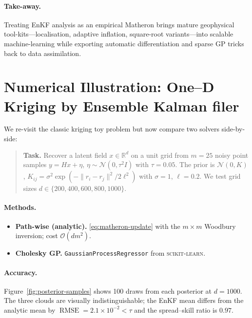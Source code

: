 \documentclass[runningheads]{llncs}
\begin{document}
\paragraph{Take-away.}
Treating EnKF analysis as an empirical Matheron  brings mature geophysical tool-kits—localisation, adaptive inflation, square-root variants—into scalable machine-learning while exporting automatic differentiation and sparse GP tricks back to data assimilation.

\section{Numerical Illustration:  One–D Kriging by Ensemble Kalman filer}
\label{sec:numerical-demo}

We re-visit the classic kriging toy problem but now compare two solvers side-by-side:

\begin{quote}
\textbf{Task.}  Recover a latent field
$x\!\in\!\mathbb R^{d}$ on a unit grid from
$m\!=\!25$ noisy point samples
$y = Hx + \eta$, $\eta\!\sim\!\mathcal N(0,\tau^{2}I)$ with
$\tau=0.05$.  The prior is
$\mathcal N(0,K)$, $K_{ij}=\sigma^{2}\!\exp(-\lVert r_i-r_j\rVert^{2}/2\ell^{2})$
with $\sigma=1$, $\ell=0.2$.
We test grid sizes $d\in\{200,400,600,800, 1000\}$.
\end{quote}

\paragraph{Methods.}
\begin{itemize}
\item \textbf{Path-wise (analytic).}  \eqref{eq:matheron-update} with the
      $m\!\times\!m$ Woodbury inversion; cost $\mathcal O(dm^{2})$.
\item \textbf{Cholesky GP.}  \texttt{GaussianProcessRegressor}
      from \textsc{scikit-learn}.
\end{itemize}

\paragraph{Accuracy.}
Figure~\ref{fig:posterior-samples} shows 100 draws from each posterior at
$d=1000$.  The three clouds are visually indistinguishable; the EnKF
mean differs from the analytic mean by
$\operatorname{RMSE}=2.1\!\times\!10^{-2}\!<\!\tau$ and the
spread–skill ratio is $0.97$.
\end{document}
